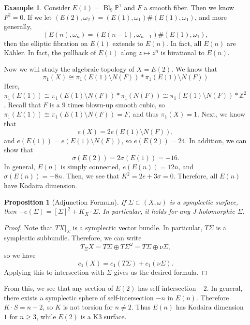 \documentclass[leqno, openany]{memoir}
\newtheorem{prop}[thm]{Proposition}
\theoremstyle{definition}
\newtheorem{exm}[thm]{Example}
\theoremstyle{remark}
\theoremstyle{plain}
\theoremstyle{definition}
\theoremstyle{remark}
\newcommand{\Z}{\mathbb{Z}}
\renewcommand{\P}{\mathbb{P}}
\DeclareMathOperator{\Bl}{Bl} %
\begin{document}
    \begin{exm}
        Consider $E(1) = \Bl_9 \P^1$ and $F$ a smooth fiber. Then we know $F^2 = 0$. If we let $(E(2), \omega_2) = (E(1), \omega_1) \# (E(1), \omega_1)$, and more generally, 
        \[ (E(n), \omega_n) = (E(n-1), \omega_{n-1}) \# (E(1), \omega_1), \]
        then the elliptic fibration on $E(1)$ extends to $E(n)$. In fact, all $E(n)$ are K\"ahler. In fact, the pullback of $E(1)$ along $z \mapsto z^n$ is birational to $E(n)$.
    \end{exm}

    Now we will study the algebraic topology of $X = E(2)$. We know that 
    \[ \pi_1(X) \cong \pi_1(E(1) \setminus N(F)) * \pi_1(E(1) \setminus N(F)) \]
    Here, $\pi_1(E(1)) \cong \pi_1(E(1) \setminus N(F)) * \pi_1(N(F)) \cong \pi_1(E(1) \setminus N(F)) * \Z^2$. Recall that $F$ is a $9$ times blown-up smooth cubic, so $\pi_1(E(1)) \cong \pi_1(E(1) \setminus N(F)) = F$, and thus $\pi_1(X) = 1$. Next, we know that 
    \[ e(X) = 2e(E(1) \setminus N(F)), \] 
    and $e(E(1)) = e(E(1) \setminus N(F))$, so $e(E(2)) = 24$. In addition, we can show that
    \[ \sigma(E(2)) = 2 \sigma(E(1)) = -16. \]
    In general, $E(n)$ is simply connected, $e(E(n)) = 12n$, and $\sigma(E(n)) = -8n$. Then, we see that $K^2 = 2e + 3 \sigma = 0$. Therefore, all $E(n)$ have Kodaira dimension.

    \begin{prop}[Adjunction Formula]
        If $\Sigma \subset (X, \omega)$ is a symplectic surface, then $-e(\Sigma) = [\Sigma]^2 + K_X \cdot \Sigma$. In particular, it holds for any $J$-holomorphic $\Sigma$.
    \end{prop}

    \begin{proof}
        Note that $TX|_{\Sigma}$ is a symplectic vector bundle. In particular, $T \Sigma$ is a symplectic subbundle. Therefore, we can write
        \[ T_{\Sigma} X = T \Sigma \oplus T \Sigma^{\omega} = T \Sigma \oplus \nu \Sigma, \]
        so we have
        \[ c_1(X) = c_1(T \Sigma) + c_1(\nu \Sigma). \]
        Applying this to intersection with $\Sigma$ gives us the desired formula.
    \end{proof}

    From this, we see that any section of $E(2)$ has self-intersection $-2$. In general, there exists a symplectic sphere of self-intersection $-n$ in $E(n)$. Therefore $K \cdot S = n-2$, so $K$ is not torsion for $n \neq 2$. Thus $E(n)$ has Kodaira dimension $1$ for $n \geq 3$, while $E(2)$ is a K3 surface.
\end{document}
